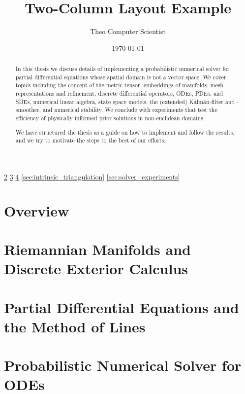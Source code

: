 
\def\COMPILINGFROMMAIN{}


\title{Two-Column Layout Example}
\author{Theo Computer Scientist}
\date{\today}
\maketitle


\begin{abstract}
In this thesis we discuss details of implementing a probabilistic numerical solver for partial differential equations whose spatial domain is not a vector space. We cover topics including the concept of the metric tensor, embeddings of manifolds, mesh representations and refinement, discrete differential operators, ODEs, PDEs, and SDEs, numerical linear algebra, state space models, the (extended) Kálmán-filter and -smoother, and numerical stability. We conclude with experiments that test the efficiency of physically informed prior solutions in non-euclidean domains.

We have structured the thesis as a guide on how to implement and follow the results, and we try to motivate the steps to the best of our efforts.
\end{abstract}

\newpage
\tableofcontents

\ref{sec:manifolds}
\ref{sec:pde}
\ref{sec:prior}
\ref{sec:intrinsic_triangulation}
\ref{sec:solver_experiments}


\newpage
\section{Overview}\label{sec:overview}


\newpage
\section{Riemannian Manifolds and Discrete Exterior Calculus}\label{sec:manifolds}


\newpage
\section{Partial Differential Equations and the Method of Lines}\label{sec:pde}


\newpage
\section{Probabilistic Numerical Solver for ODEs}\label{sec:prior}


